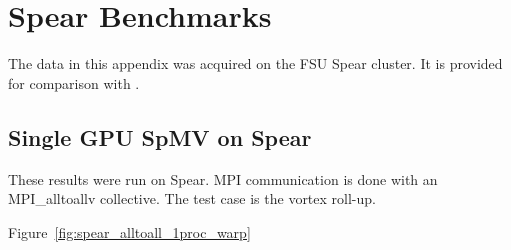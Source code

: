

\chapter{Spear Benchmarks} 
\label{app:spear_alltoallv_benchmarks}

The data in this appendix was acquired on the FSU Spear cluster. It is provided for comparison with \cite{BolligFlyerErlebacher2012}.


\section{Single GPU SpMV on Spear}

These results were run on Spear. MPI communication is done with an MPI\_alltoallv collective. The test case is the vortex roll-up. 

Figure~\ref{fig:spear_alltoall_1proc_warp} 

